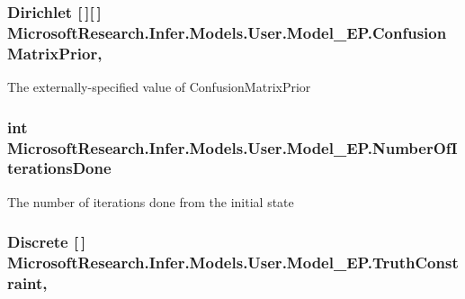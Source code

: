 \subsubsection[{Confusion\+Matrix\+Prior}]{\setlength{\rightskip}{0pt plus 5cm}Dirichlet \mbox{[}$\,$\mbox{]}\mbox{[}$\,$\mbox{]} Microsoft\+Research.\+Infer.\+Models.\+User.\+Model\+\_\+\+E\+P.\+Confusion\+Matrix\+Prior\hspace{0.3cm}{\ttfamily [get]}, {\ttfamily [set]}}\label{class_microsoft_research_1_1_infer_1_1_models_1_1_user_1_1_model___e_p_a5d2f1483d0debe876c9c9504738761e7}


The externally-\/specified value of \textquotesingle{}Confusion\+Matrix\+Prior\textquotesingle{}

\hypertarget{class_microsoft_research_1_1_infer_1_1_models_1_1_user_1_1_model___e_p_a0a9e34e70ccab7709f1134b9b5889a47}{}
\subsubsection[{Number\+Of\+Iterations\+Done}]{\setlength{\rightskip}{0pt plus 5cm}int Microsoft\+Research.\+Infer.\+Models.\+User.\+Model\+\_\+\+E\+P.\+Number\+Of\+Iterations\+Done\hspace{0.3cm}{\ttfamily [get]}}\label{class_microsoft_research_1_1_infer_1_1_models_1_1_user_1_1_model___e_p_a0a9e34e70ccab7709f1134b9b5889a47}


The number of iterations done from the initial state

\hypertarget{class_microsoft_research_1_1_infer_1_1_models_1_1_user_1_1_model___e_p_acffd4167727f940a144a3efadfc2d805}{}
\subsubsection[{Truth\+Constraint}]{\setlength{\rightskip}{0pt plus 5cm}Discrete \mbox{[}$\,$\mbox{]} Microsoft\+Research.\+Infer.\+Models.\+User.\+Model\+\_\+\+E\+P.\+Truth\+Constraint\hspace{0.3cm}{\ttfamily [get]}, {\ttfamily [set]}}\label{class_microsoft_research_1_1_infer_1_1_models_1_1_user_1_1_model___e_p_acffd4167727f940a144a3efadfc2d805}


